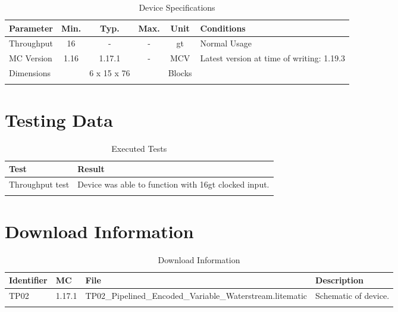 \documentclass[10pt]{datasheet}
\begin{document}
\begin{table}[h]
    \caption{Device Specifications}
    \begin{tabularx}{\textwidth}{l | c c c | c | X}
        \thickhline
        \textbf{Parameter} & \textbf{Min.} & \textbf{Typ.} & \textbf{Max.} &
        \textbf{Unit} & \textbf{Conditions} \\
        \hline
        Throughput  & 16 & - & - & gt & Normal Usage \\
        \hline
        MC Version & 1.16 & 1.17.1 & - & MCV & Latest version at time of writing: 1.19.3\\
        \hline
        Dimensions & & 6 x 15 x 76 & & Blocks & \\
        \thickhline
\end{tabularx}
\end{table}

\section{Testing Data}

\begin{table}[h]
\caption{Executed Tests}
\begin{tabularx}{\textwidth}{l | X}
    \thickhline
    \textbf{Test} & \textbf{Result} \\
    \hline
    Throughput test & Device was able to function with 16gt clocked input. \\
    \thickhline
\end{tabularx}
\end{table}

\section{Download Information}
\begin{table}[h]
    \caption{Download Information}
    \begin{tabularx}{\textwidth}{l | l | l | X}
        \thickhline
        \textbf{Identifier} & \textbf{MC} & \textbf{File} & \textbf{Description} \\
        \hline
        TP02 & 1.17.1 & TP02\_Pipelined\_Encoded\_Variable\_Waterstream.litematic & Schematic of device. \\
        \hline
        \thickhline
    \end{tabularx}
\end{table}
\end{document}
